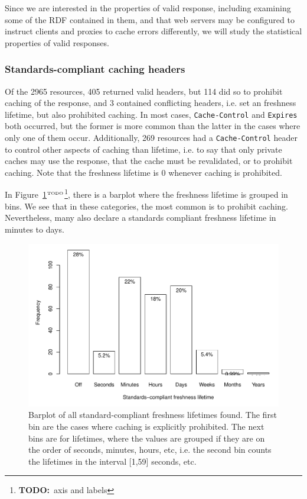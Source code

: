 \documentclass{llncs}
\newcommand{\httph}[1]{\texttt{#1}}
\newcommand{\todo}[1]{\ensuremath{^{\textrm{\tiny{TODO}\normalsize}}}\footnote{\textbf{TODO:}~#1}}
\begin{document}
Since we are interested in the properties of valid response, including
examining some of the RDF contained in them, and that web servers may
be configured to instruct clients and proxies to cache errors
differently, we will study the statistical properties of valid
responses.

\subsubsection{Standards-compliant caching headers}

Of the 2965 resources, 405 returned valid headers, but 114 did so to
prohibit caching of the response, and 3 contained conflicting
headers, i.e. set an freshness lifetime, but also prohibited
caching. In most cases, \httph{Cache-Control} and \httph{Expires} both
occurred, but the former is more common than the latter in the cases
where only one of them occur.  Additionally, 269 resources had a
\httph{Cache-Control} header to control other aspects of caching than
lifetime, i.e. to say that only private caches may use the response,
that the cache must be revalidated, or to prohibit caching. 
Note that the freshness lifetime is 0 whenever caching is prohibited.

In Figure~\ref{fig:hardall}\todo{axis and labels}, there is a barplot where
the freshness lifetime is grouped in bins. We see that in these
categories, the most common is to prohibit caching. Nevertheless, many
also declare a standards compliant freshness lifetime in minutes to
days.

\begin{figure}[ht]
  \centerline{%
    \includegraphics[width=.9\textwidth]{hardall.pdf}}
  \caption{Barplot of all standard-compliant freshness lifetimes
    found. The first bin are the cases where caching is explicitly
    prohibited. The next bins are for lifetimes, where the values are
    grouped if they are on the order of seconds, minutes, hours, etc,
    i.e. the second bin counts the lifetimes in the interval [1,59]
    seconds, etc.}
  \label{fig:hardall}
\end{figure}
\end{document}
